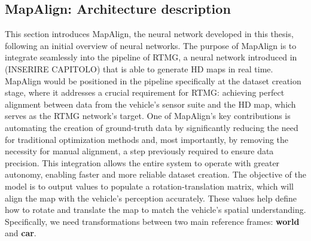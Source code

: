 \subsection{MapAlign: Architecture description}
This section introduces MapAlign, the neural network developed in this thesis, following an initial overview of neural networks. The purpose of MapAlign is to integrate seamlessly into the pipeline of RTMG, a neural network introduced in (INSERIRE CAPITOLO) that is able to generate HD maps in real time. 
MapAlign would be positioned in the pipeline specifically at the dataset creation stage, where it addresses a crucial requirement for RTMG: achieving perfect alignment between data from the vehicle's sensor suite and the HD map, which serves as the RTMG network’s target.
One of MapAlign’s key contributions is automating the creation of ground-truth data by significantly reducing the need for traditional optimization methods and, most importantly, by removing the necessity for manual alignment, a step previously required to ensure data precision. This integration allows the entire system to operate with greater autonomy, enabling faster and more reliable dataset creation. 
The objective of the model is to output values to populate a rotation-translation matrix, which will align the map with the vehicle’s perception accurately. These values help define how to rotate and translate the map to match the vehicle's spatial understanding. Specifically, we need transformations between two main reference frames: \textbf{world} and \textbf{car}.
